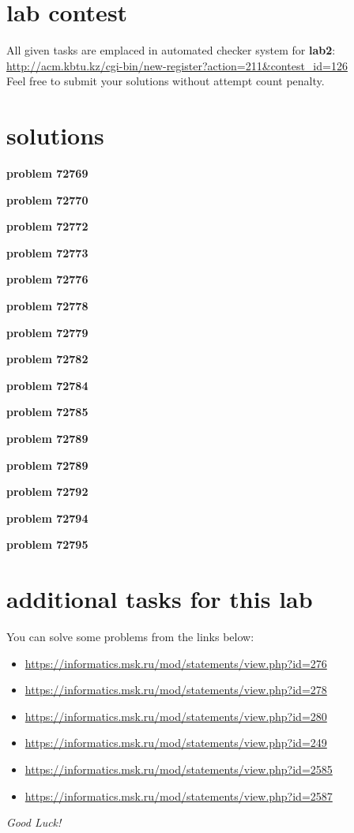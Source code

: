 \documentclass[12pt]{article}%
\begin{document}
    \section{lab contest}
    
    All given tasks are emplaced in automated checker system for \textbf{lab2}: \url{http://acm.kbtu.kz/cgi-bin/new-register?action=211&contest_id=126}\\
    Feel free to submit your solutions without attempt count penalty.

    \section{solutions}

    \textbf{problem 72769}
    
    \textbf{problem 72770}
    
    \textbf{problem 72772}
    
    \textbf{problem 72773}
    
    \textbf{problem 72776}
    
    \textbf{problem 72778}
    
    \textbf{problem 72779}
    
    \textbf{problem 72782}
    
    \textbf{problem 72784}
    
    \textbf{problem 72785}
    
    \textbf{problem 72789}
    
    \textbf{problem 72789}
    
    \textbf{problem 72792}
    
    \textbf{problem 72794}
    
    \textbf{problem 72795}
    

    \section{additional tasks for this lab}
    You can solve some problems from the links below:
    \begin{itemize}
        \item \url{https://informatics.msk.ru/mod/statements/view.php?id=276}
        \item \url{https://informatics.msk.ru/mod/statements/view.php?id=278}
        \item \url{https://informatics.msk.ru/mod/statements/view.php?id=280}
        \item \url{https://informatics.msk.ru/mod/statements/view.php?id=249}
        \item \url{https://informatics.msk.ru/mod/statements/view.php?id=2585}
        \item \url{https://informatics.msk.ru/mod/statements/view.php?id=2587}
    \end{itemize}
    \vspace{5cm}
    \begin{center}
    {\large \emph{Good Luck!}}
    \end{center}
\end{document}
